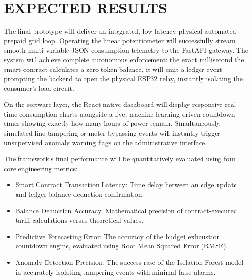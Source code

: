 \chapter{EXPECTED RESULTS}
The final prototype will deliver an integrated, low-latency physical automated prepaid grid loop. Operating the linear potentiometer will successfully stream smooth multi-variable JSON consumption telemetry to the FastAPI gateway. The system will achieve complete autonomous enforcement: the exact millisecond the smart contract calculates a zero-token balance, it will emit a ledger event prompting the backend to open the physical ESP32 relay, instantly isolating the consumer's load circuit.

On the software layer, the React-native dashboard will display responsive real-time consumption charts alongside a live, machine-learning-driven countdown timer showing exactly how many hours of power remain. Simultaneously, simulated line-tampering or meter-bypassing events will instantly trigger unsupervised anomaly warning flags on the administrative interface.

The framework's final performance will be quantitatively evaluated using four core engineering metrics:
\begin {itemize}

\item Smart Contract Transaction Latency: Time delay between an edge update and ledger balance deduction confirmation.

\item Balance Deduction Accuracy: Mathematical precision of contract-executed tariff calculations versus theoretical values.

\item Predictive Forecasting Error: The accuracy of the budget exhaustion countdown engine, evaluated using Root Mean Squared Error (RMSE).

\item Anomaly Detection Precision: The success rate of the Isolation Forest model in accurately isolating tampering events with minimal false alarms.
\end{itemize}
